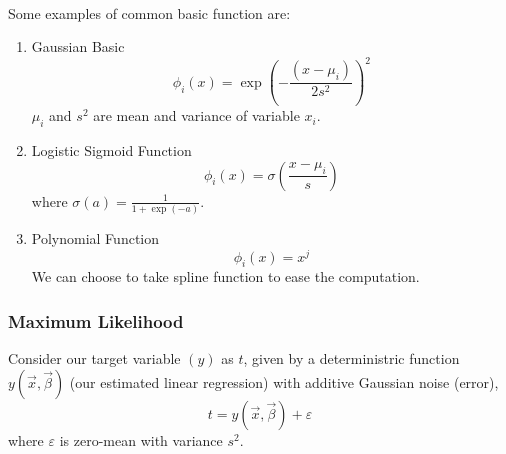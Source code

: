 \documentclass{article}
\begin{document}
\paragraph{}
Some examples of common basic function are:
\begin{enumerate}
    \item Gaussian Basic \\
    \begin{equation*}
        \phi_i(x) = \exp(-\frac{(x-\mu_i)}{2s^2})^2
    \end{equation*}
    $\mu_i$ and $s^2$ are mean and variance of variable $x_i$.
    \item Logistic Sigmoid Function \\
    \begin{equation*}
        \phi_i(x) = \sigma(\frac{x-\mu_i}{s})
    \end{equation*}
    where $\sigma(a)=\frac{1}{1+\exp(-a)}$.
    \item Polynomial Function
    \begin{equation*}
        \phi_i(x) = x^j
    \end{equation*}
    We can choose to take spline function to ease the computation.
\end{enumerate}

\subsubsection{Maximum Likelihood}
Consider our target variable $(y)$ as $t$, given by a deterministric function $y(\Vec{x},\Vec{\beta})$ (our estimated linear regression) with additive Gaussian noise (error),
\begin{equation*}
    t = y(\Vec{x},\Vec{\beta}) + \varepsilon
\end{equation*}
where $\varepsilon$ is zero-mean with variance $s^2$.
\end{document}
